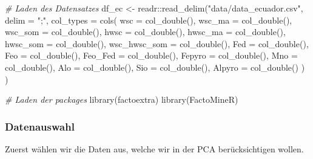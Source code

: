 \documentclass[
]{article}
\newenvironment{Shaded}{\begin{snugshade}}{\end{snugshade}}
\newcommand{\AttributeTok}[1]{\textcolor[rgb]{0.77,0.63,0.00}{#1}}
\newcommand{\CommentTok}[1]{\textcolor[rgb]{0.56,0.35,0.01}{\textit{#1}}}
\newcommand{\FunctionTok}[1]{\textcolor[rgb]{0.00,0.00,0.00}{#1}}
\newcommand{\NormalTok}[1]{#1}
\newcommand{\OtherTok}[1]{\textcolor[rgb]{0.56,0.35,0.01}{#1}}
\newcommand{\SpecialCharTok}[1]{\textcolor[rgb]{0.00,0.00,0.00}{#1}}
\newcommand{\StringTok}[1]{\textcolor[rgb]{0.31,0.60,0.02}{#1}}
\begin{document}
\begin{Shaded}
\begin{Highlighting}[]
\CommentTok{\# Laden des Datensatzes }
\NormalTok{df\_ec }\OtherTok{\textless{}{-}}\NormalTok{ readr}\SpecialCharTok{::}\FunctionTok{read\_delim}\NormalTok{(}\StringTok{"data/data\_ecuador.csv"}\NormalTok{, }\AttributeTok{delim =} \StringTok{";"}\NormalTok{, }\AttributeTok{col\_types =} 
                          \FunctionTok{cols}\NormalTok{(}
                            \AttributeTok{wsc =} \FunctionTok{col\_double}\NormalTok{(),}
                            \AttributeTok{wsc\_ma =} \FunctionTok{col\_double}\NormalTok{(),}
                            \AttributeTok{wsc\_som =} \FunctionTok{col\_double}\NormalTok{(),}
                            \AttributeTok{hwsc =} \FunctionTok{col\_double}\NormalTok{(),}
                            \AttributeTok{hwsc\_ma =} \FunctionTok{col\_double}\NormalTok{(),}
                            \AttributeTok{hwsc\_som =} \FunctionTok{col\_double}\NormalTok{(),}
                            \AttributeTok{wsc\_hwsc\_som =} \FunctionTok{col\_double}\NormalTok{(),}
                            \AttributeTok{Fed =} \FunctionTok{col\_double}\NormalTok{(),}
                            \AttributeTok{Feo =} \FunctionTok{col\_double}\NormalTok{(),}
                            \AttributeTok{Feo\_Fed =} \FunctionTok{col\_double}\NormalTok{(),}
                            \AttributeTok{Fepyro =} \FunctionTok{col\_double}\NormalTok{(),}
                            \AttributeTok{Mno =} \FunctionTok{col\_double}\NormalTok{(),}
                            \AttributeTok{Alo =} \FunctionTok{col\_double}\NormalTok{(),}
                            \AttributeTok{Sio =} \FunctionTok{col\_double}\NormalTok{(),}
                            \AttributeTok{Alpyro =} \FunctionTok{col\_double}\NormalTok{()}
\NormalTok{                          )}
\NormalTok{                        )}

\CommentTok{\# Laden der packages}
\FunctionTok{library}\NormalTok{(factoextra)}
\FunctionTok{library}\NormalTok{(FactoMineR)}
\end{Highlighting}
\end{Shaded}

\hypertarget{datenauswahl}{%
\subsubsection{Datenauswahl}\label{datenauswahl}}

Zuerst wählen wir die Daten aus, welche wir in der PCA berücksichtigen wollen.
\end{document}
